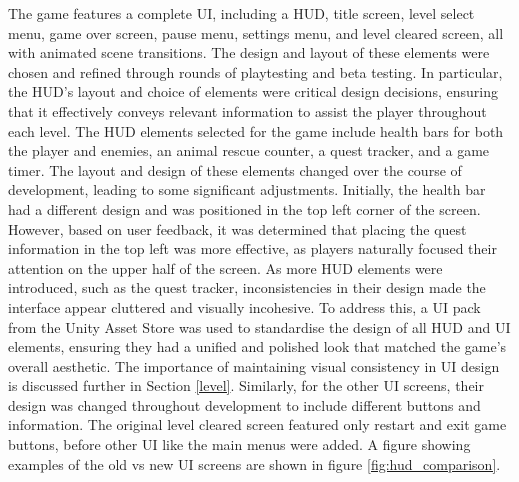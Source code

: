 \documentclass[10pt]{final_report}
\begin{document}
The game features a complete UI, including a HUD, title screen, level select menu, game over screen, pause menu, settings menu, and level cleared screen, all with animated scene transitions. The design and layout of these elements were chosen and refined through rounds of playtesting and beta testing. In particular, the HUD's layout and choice of elements were critical design decisions, ensuring that it effectively conveys relevant information to assist the player throughout each level.
\newline
The HUD elements selected for the game include health bars for both the player and enemies, an animal rescue counter, a quest tracker, and a game timer. The layout and design of these elements changed over the course of development, leading to some significant adjustments. Initially, the health bar had a different design and was positioned in the top left corner of the screen. However, based on user feedback, it was determined that placing the quest information in the top left was more effective, as players naturally focused their attention on the upper half of the screen.
\newline
As more HUD elements were introduced, such as the quest tracker, inconsistencies in their design made the interface appear cluttered and visually incohesive. To address this, a UI pack from the Unity Asset Store was used to standardise the design of all HUD and UI elements, ensuring they had a unified and polished look that matched the game’s overall aesthetic. The importance of maintaining visual consistency in UI design is discussed further in Section \ref{level}. Similarly, for the other UI screens, their design was changed throughout development to include different buttons and information. The original level cleared screen featured only restart and exit game buttons, before other UI like the main menus were added. A figure showing examples of the old vs new UI screens are shown in figure \ref{fig:hud_comparison}.
\end{document}
